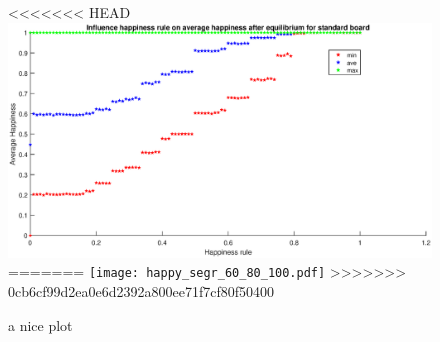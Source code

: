\documentclass{article}
\begin{document}
\begin{figure}[h]
    \centering
<<<<<<< HEAD
    \includegraphics{happinessregel-gemhappinesseind-2.eps}
=======
    \texttt{[image: happy\_segr\_60\_80\_100.pdf]}
>>>>>>> 0cb6cf99d2ea0e6d2392a800ee71f7cf80f50400
    \caption{a nice plot}
    \label{fig:mesh1}
\end{figure}
\end{document}
